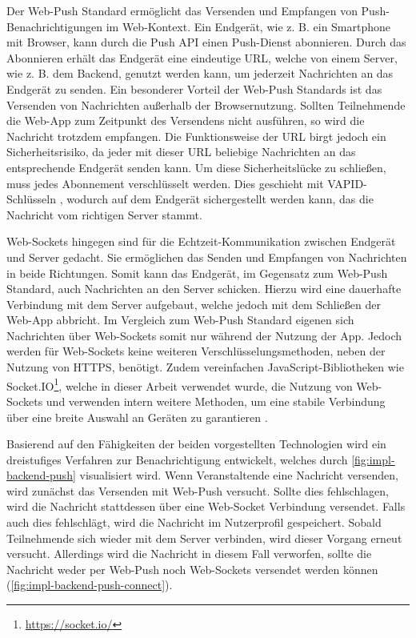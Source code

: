 Der Web-Push Standard ermöglicht das Versenden und Empfangen von
Push-Benach\-richti\-gungen im Web-Kontext. Ein Endgerät, wie z. B. ein
Smartphone mit Browser, kann durch die Push API einen Push-Dienst abonnieren.
Durch das Abonnieren erhält das Endgerät eine eindeutige URL, welche von einem
Server, wie z. B. dem Backend, genutzt werden kann, um jederzeit Nachrichten an
das Endgerät zu senden. Ein besonderer Vorteil der Web-Push Standards ist das
Versenden von Nachrichten außerhalb der Browsernutzung. Sollten Teilnehmende die
Web-App zum Zeitpunkt des Versendens nicht ausführen, so wird die Nachricht
trotzdem empfangen. Die Funktionsweise der URL birgt jedoch ein
Sicherheitsrisiko, da jeder mit dieser URL beliebige Nachrichten an das
entsprechende Endgerät senden kann. Um diese Sicherheitslücke zu schließen, muss
jedes Abonnement verschlüsselt werden. Dies geschieht mit VAPID-Schlüsseln
\cite{VAPID}, wodurch auf dem Endgerät sichergestellt werden kann, das die
Nachricht vom richtigen Server stammt.

Web-Sockets hingegen sind für die Echtzeit-Kommunikation zwischen Endgerät und
Server gedacht. Sie ermöglichen das Senden und Empfangen von Nachrichten in
beide Richtungen. Somit kann das Endgerät, im Gegensatz zum Web-Push Standard,
auch Nachrichten an den Server schicken. Hierzu wird eine dauerhafte Verbindung
mit dem Server aufgebaut, welche jedoch mit dem Schließen der Web-App abbricht.
Im Vergleich zum Web-Push Standard eigenen sich Nachrichten über Web-Sockets
somit nur während der Nutzung der App. Jedoch werden für Web-Sockets keine
weiteren Verschlüsselungsmethoden, neben der Nutzung von HTTPS, benötigt. Zudem
vereinfachen JavaScript-Bibliotheken wie
Socket.IO\footnote{\url{https://socket.io/}}, welche in dieser Arbeit verwendet
wurde, die Nutzung von Web-Sockets und verwenden intern weitere Methoden, um
eine stabile Verbindung über eine breite Auswahl an Geräten zu garantieren
\cite{SocketIO2022}.


Basierend auf den Fähigkeiten der beiden vorgestellten Technologien wird ein
dreistufiges Verfahren zur Benachrichtigung entwickelt, welches durch
\autoref{fig:impl-backend-push} visualisiert wird. Wenn Veranstaltende eine
Nachricht versenden, wird zunächst das Versenden mit Web-Push versucht. Sollte
dies fehlschlagen, wird die Nachricht stattdessen über eine Web-Socket
Verbindung versendet. Falls auch dies fehlschlägt, wird die Nachricht im
Nutzerprofil gespeichert. Sobald Teilnehmende sich wieder mit dem Server
verbinden, wird dieser Vorgang erneut versucht. Allerdings wird die Nachricht in
diesem Fall verworfen, sollte die Nachricht weder per Web-Push noch Web-Sockets
versendet werden können (\autoref{fig:impl-backend-push-connect}).

